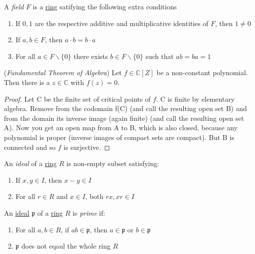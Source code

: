 \begin{definition} \label{dedekind} %

  \end{definition}

  \begin{definition} \label{field} %
    A \emph{field} $F$ is a \hyperref[ring]{ring} satifying the following extra conditions
    \begin{enumerate}
      \item If $0,1$ are the respective additive and multiplicative identities of $F$, then $1 \neq 0$
      \item If $a,b \in F$, then $a\cdot b = b \cdot a$ 
      \item For all $a \in F \backslash \lbrace 0 \rbrace $ there exists $b \in F \backslash \lbrace 0 \rbrace $ such that $ab = ba = 1$
    \end{enumerate}
  \end{definition}

  \begin{theorem} \label{fun} (\textit{Fundamental Theorem of Algebra})
    Let $f \in \mathbb{C}[Z]$ be a non-constant polynomial.  Then there is a $z\in\mathbb{C}$ with $f(z)=0$.
  \end{theorem}
  \begin{proof}
    Let C be the finite set of critical points of $f$. C is finite by elementary algebra. Remove from the codomain f(C) (and call the resulting open set B) and from the domain its inverse image (again finite) (and call the resulting open set A). Now you get an open map from A to B, which is also closed, because any polynomial is proper (inverse images of compact sets are compact). But B is connected and so $f$ is surjective.
  \end{proof}

  \begin{definition} \label{ideal} %
    An \emph{ideal} of a \hyperref[ring]{ring} $R$ is non-empty subset satisfying: 
    \begin{enumerate}
      \item If $x,y \in I$, then $x - y \in I$ 
      \item For all $r \in R$ and $x \in I$, both $rx,xr \in I$
    \end{enumerate}
  \end{definition}

  \begin{definition} \label{primeideal}%
    An \hyperref[ideal]{ideal} $\mathfrak{p}$ of a \hyperref[ring]{ring} $R$ is \emph{prime} if:
    \begin{enumerate}
      \item For all $a,b \in R$, if $ab \in \mathfrak{p}$, then $a \in \mathfrak{p}$ or $b \in \mathfrak{p}$
      \item $\mathfrak{p}$ does not eqaul the whole ring $R$
    \end{enumerate}
  \end{definition}

